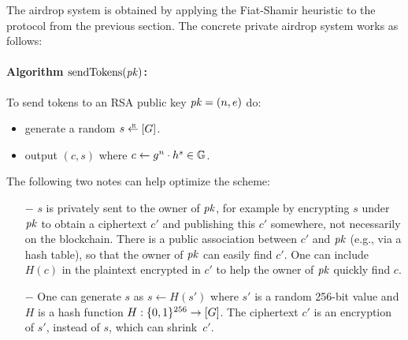 \documentclass[11pt]{article}
\begin{document}
The airdrop system is obtained by applying the Fiat-Shamir
heuristic to the protocol from the previous section. 
The concrete private airdrop system works as follows:

\paragraph{Algorithm $\text{sendTokens}(\mathit{pk})$:}
To send tokens to an RSA public key $\mathit{pk} = (n, e)$ do:
\begin{itemize}
\item 
generate a random $s \rgets \range{G}$.

\item 
output $(c, s)$ where $c \gets g^n \cdot h^s \in \mathbb G$.
\end{itemize}

\medskip\noindent 
The following two notes can help optimize the scheme:
\begin{itemize}
\item[$-$] $s$ is privately sent to the owner of $\mathit{pk}$, for example
by encrypting $s$ under $\mathit{pk}$ to obtain a ciphertext $c'$ and
publishing this $c'$ somewhere, not necessarily on the blockchain.  There is
a public association between $c'$ and $\mathit{pk}$ (e.g., via a hash table),
so that the owner of $\mathit{pk}$ can easily find $c'$.  One can include
$H(c)$ in the plaintext encrypted in $c'$ to help the owner of $\mathit{pk}$
quickly find $c$.  

\item[$-$] One can generate $s$ 
as $s \gets H(s')$ where $s'$ is a random 256-bit value and $H$ is a hash
function $H:\{0,1\}^{256} \to [{G}]$.  The ciphertext $c'$ is
an encryption of $s'$, instead of $s$, which can shrink~$c'$.
\end{itemize}
\end{document}

